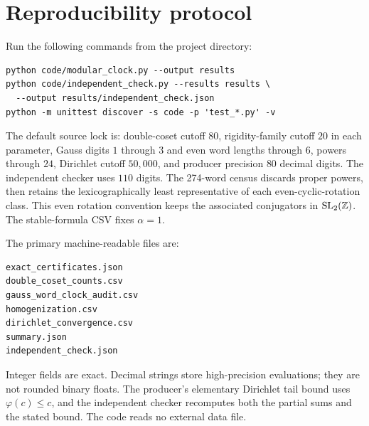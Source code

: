 \section{Reproducibility protocol}\label{app:reproducibility}

Run the following commands from the project directory:
\begin{verbatim}
python code/modular_clock.py --output results
python code/independent_check.py --results results \
  --output results/independent_check.json
python -m unittest discover -s code -p 'test_*.py' -v
\end{verbatim}

The default source lock is: double-coset cutoff $80$, rigidity-family cutoff
$20$ in each parameter, Gauss digits $1$ through $3$ and even word lengths
through $6$, powers through $24$, Dirichlet cutoff $50{,}000$, and producer
precision $80$ decimal digits.  The independent checker uses $110$ digits.
The 274-word census discards proper powers, then retains the lexicographically
least representative of each even-cyclic-rotation class.  This even rotation
convention keeps the associated conjugators in $\operatorname{SL}_2(\mathbb Z)$.  The stable-formula
CSV fixes $\alpha=1$.

The primary machine-readable files are:
\begin{verbatim}
exact_certificates.json
double_coset_counts.csv
gauss_word_clock_audit.csv
homogenization.csv
dirichlet_convergence.csv
summary.json
independent_check.json
\end{verbatim}

Integer fields are exact.  Decimal strings store high-precision evaluations;
they are not rounded binary floats.  The producer's elementary Dirichlet tail
bound uses $\varphi(c)\leq c$, and the independent checker recomputes both the
partial sums and the stated bound.  The code reads no external data file.
